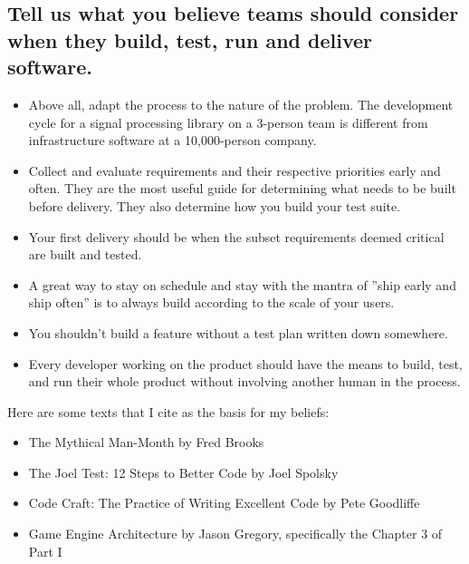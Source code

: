 \documentclass{article}
\begin{document}
\subsection{Tell us what you believe teams should consider when they build,
  test, run and deliver software.}
\begin{itemize}
  \item Above all, adapt the process to the nature of the problem. The development cycle for a signal processing library on a 3-person team is different from infrastructure software at a 10,000-person company.
  \item Collect and evaluate requirements and their respective priorities early and often. They are the most
        useful guide for determining what needs to be built before delivery. They also determine how you build
        your test suite.
  \item Your first delivery should be when the subset requirements deemed critical are built and tested.
  \item A great way to stay on schedule and stay with the mantra of ”ship early and ship often” is to always
        build according to the scale of your users.
  \item You shouldn’t build a feature without a test plan written down somewhere.
  \item Every developer working on the product should have the means to build, test, and run their whole
        product without involving another human in the process.
\end{itemize}

Here are some texts that I cite as the basis for my beliefs:

\begin{itemize}
  \item The Mythical Man-Month by Fred Brooks~\cite{mmm}
  \item The Joel Test: 12 Steps to Better Code by Joel Spolsky\cite{spolsky_code}
  \item Code Craft: The Practice of Writing Excellent Code by Pete Goodliffe\cite{codecraft}
  \item Game Engine Architecture by Jason Gregory, specifically the Chapter 3 of Part I \cite{key}
\end{itemize}
\end{document}
